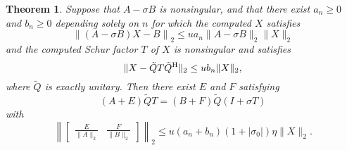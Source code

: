 \documentclass[12pt]{article}
\def\H{{\rm H}}
\newtheorem{theorem}{Theorem}
\begin{document}
\begin{theorem}
  \label{th:deflating_subspaces}
  Suppose that $A-\sigma B$ is nonsingular, and that there exist
  $a_n\geq 0$ and $b_n\geq 0$ depending solely on $n$ for which the
  computed $X$ satisfies
  \begin{equation}
    \label{eq:Xerror}
    \left\| (A-\sigma B) X - B \right\|_2 \leq u a_n \|A-\sigma B\|_2 \|X\|_2
  \end{equation}
  and the computed Schur factor $T$ of $X$ is nonsingular and satisfies
  \begin{equation}
    \label{eq:schur_error}
    \| X - \tilde{Q} T \tilde{Q}^\H \|_2 \leq u b_n \|X\|_2,
  \end{equation}
  where $\tilde{Q}$ is exactly unitary.  Then there exist $E$ and $F$
  satisfying
  \begin{equation*}
    (A+E)\tilde{Q} T = (B+F)\tilde{Q}(I+\sigma T)
  \end{equation*}
  with
  \begin{equation*}
    \left\|
      \begin{bmatrix}
        \frac{E}{\|A\|_2} & \frac{F}{\|B\|_2}
      \end{bmatrix}
    \right\|_2 \leq u (a_n + b_n)(1+|\sigma_0|) \eta \|X\|_2.
  \end{equation*}
\end{theorem}
\end{document}

